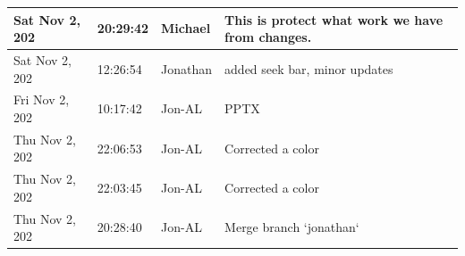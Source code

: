 \documentclass[11pt]{article}
\begin{document}
\begin{center}
\begin{longtable}{|p{2.7cm}|l|p{2cm}|p{8cm}|}
           \hline Sat Nov 2,  202                              & 20:29:42                           & Michael                                 & This is protect what work we have from changes.                                                                                                                                                                                                                                                            \\
           \hline Sat Nov 2,  202                              & 12:26:54                           & Jonathan                                & added seek bar, minor updates                                                                                                                                                                                                                                                                              \\
           \hline Fri Nov 2,  202                              & 10:17:42                           & Jon-AL                                  & PPTX                                                                                                                                                                                                                                                                                                       \\
           \hline Thu Nov 2,  202                              & 22:06:53                           & Jon-AL                                  & Corrected a color                                                                                                                                                                                                                                                                                          \\
           \hline Thu Nov 2,  202                              & 22:03:45                           & Jon-AL                                  & Corrected a color                                                                                                                                                                                                                                                                                          \\
           \hline Thu Nov 2,  202                              & 20:28:40                           & Jon-AL                                  & Merge branch `jonathan`                                                                                                                                                                                                                                                                                    \\

\end{longtable}
\end{center}
\end{document}
